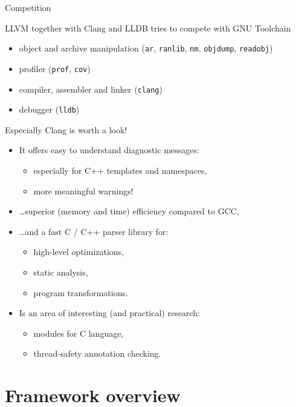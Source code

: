 \documentclass[8pt]{beamer}
\begin{document}
\begin{frame}[fragile]{Competition}
  \begin{block}{LLVM together with Clang and LLDB tries to compete with GNU Toolchain}
    \begin{itemize}
      \item object and archive manipulation (\verb+ar+, \verb+ranlib+,
        \verb+nm+, \verb+objdump+, \verb+readobj+)
      \item profiler (\verb+prof+, \verb+cov+)
      \item compiler, assembler and linker (\verb+clang+)
      \item debugger (\verb+lldb+)
    \end{itemize}
  \end{block}

  \begin{alertblock}{Especially Clang is worth a look!}
    \begin{itemize}
      \item It offers easy to understand diagnostic messages:
        \begin{itemize}
          \item especially for C++ templates and namespaces,
          \item more meaningful warnings!
        \end{itemize}
      \item \ldots superior (memory and time) efficiency compared to GCC,
      \item \ldots and a fast C / C++ parser library for:
        \begin{itemize}
          \item high-level optimizations,
          \item static analysis,
          \item program transformations.
        \end{itemize}
      \item Is an area of interesting (and practical) research:
        \begin{itemize}
          \item modules for C language,
          \item thread-safety annotation checking.
        \end{itemize}
    \end{itemize}
  \end{alertblock}
\end{frame}

\section[Overview]{Framework overview}
\end{document}
